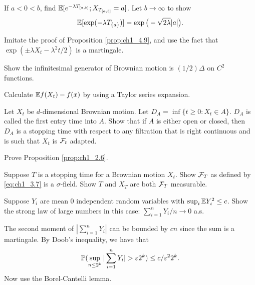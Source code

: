\begin{exercise}\label{ex:ch1_5}
If $a < 0 < b$, find $\E[e^{-\lambda T_{[a,b]}}; X_{T_{[a,b]}} = a]$. Let $b \to \infty$ to show
\[
    \E[\exp(-\lambda T_{\{a\}})] = \exp\big(-\sqrt{2\lambda}|a|\big).
\]

\hint Imitate the proof of Proposition \ref{prop:ch1_4.9}, and use the fact that $\exp(\pm\lambda X_t - \lambda^2t/2)$ is a martingale.
\end{exercise}

\begin{exercise}\label{ex:ch1_6}
Show the infinitesimal generator of Brownian motion is $(1/2)\Delta$ on $C^2$ functions.

\hint Calculate $\E f(X_t) - f(x)$ by using a Taylor series expansion.
\end{exercise}

\begin{exercise}\label{ex:ch1_7}
Let $X_t$ be $d$-dimensional Brownian motion. Let $D_A = \inf\{t \geq 0 : X_t \in A\}$. $D_A$ is called the first entry time into $A$. Show that if $A$ is either open or closed, then $D_A$ is a stopping time with respect to any filtration that is right continuous and is such that $X_t$ is $\FC_t$ adapted.
\end{exercise}

\begin{exercise}\label{ex:ch1_8}
Prove Proposition \ref{prop:ch1_2.6}.
\end{exercise}

\begin{exercise}\label{ex:ch1_9}
Suppose $T$ is a stopping time for a Brownian motion $X_t$. Show $\FC_T$ as defined by \eqref{eq:ch1_3.7} is a $\sigma$-field. Show $T$ and $X_T$ are both $\FC_T$ measurable.
\end{exercise}

\mpagebreak

\begin{exercise}\label{ex:ch1_10}
Suppose $Y_i$ are mean $0$ independent random variables with $\sup_i \E Y_i^2\leq c$. Show the strong law of large numbers in this case: $\sum_{i=1}^n Y_i/n \allowbreak\to 0$ a.s.

\hint The second moment of $|\sum_{i=1}^n Y_i|$ can be bounded by $cn$ since the sum is a martingale. By Doob's inequality, we have that
\[
    \P(\sup_{n\leq 2^k} |\sum_{i=1}^n Y_i| > \epsilon 2^k) \leq c/\epsilon^2 2^k.
\]
Now use the Borel-Cantelli lemma.
\end{exercise}

